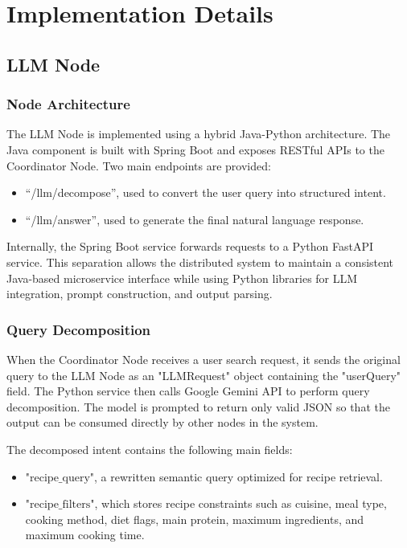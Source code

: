 \documentclass[conference]{IEEEtran}
\begin{document}
\section{Implementation Details}
\label{sec:implementation_details}

\subsection{LLM Node}
\label{sec:llmnode}

\subsubsection{Node Architecture}
The LLM Node is implemented using a hybrid Java-Python architecture. The Java component is built with Spring Boot and exposes RESTful APIs to the Coordinator Node. Two main endpoints are provided:

\begin{itemize}
    \item ``/llm/decompose'', used to convert the user query into structured intent.
    \item ``/llm/answer'', used to generate the final natural language response.
\end{itemize}

Internally, the Spring Boot service forwards requests to a Python FastAPI service. This separation allows the distributed system to maintain a consistent Java-based microservice interface while using Python libraries for LLM integration, prompt construction, and output parsing.

\subsubsection{Query Decomposition}
When the Coordinator Node receives a user search request, it sends the original query to the LLM Node as an "LLMRequest" object containing the "userQuery" field. The Python service then calls Google Gemini API to perform query decomposition. The model is prompted to return only valid JSON so that the output can be consumed directly by other nodes in the system.

The decomposed intent contains the following main fields:

\begin{itemize}
    \item $\text{"recipe\_query"}$, a rewritten semantic query optimized for recipe retrieval.
    \item $\text{"recipe\_filters"}$, which stores recipe constraints such as cuisine, meal type, cooking method, diet flags, main protein, maximum ingredients, and maximum cooking time.
\end{itemize}
\end{document}
